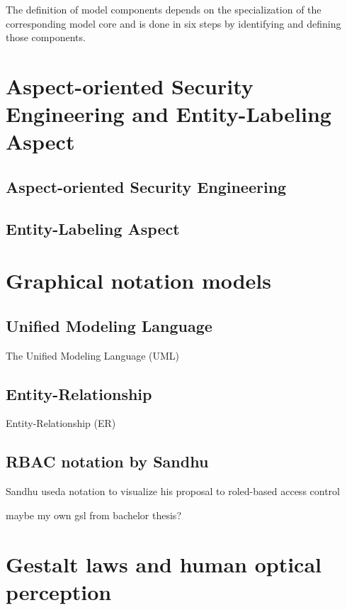 \documentclass[twoside, openright, 12pt]{book}
\begin{document}
The definition of model components depends on the specialization of the corresponding model core and is done in six steps by identifying and defining those components.



\section{Aspect-oriented Security Engineering and Entity-Labeling Aspect}
\label{AOSEEL}


\subsection{Aspect-oriented Security Engineering}
\label{AOSE}


\subsection{Entity-Labeling Aspect}
\label{EL}




\section{Graphical notation models}
\label{graphical_notations}

\subsection{Unified Modeling Language}
\label{UML}
The Unified Modeling Language (UML)

\subsection{Entity-Relationship}
\label{ER}
Entity-Relationship (ER)

\subsection{RBAC notation by Sandhu}
\label{RBAC_notation}
Sandhu useda notation to visualize his proposal to roled-based access control

maybe my own gsl from bachelor thesis?



\section{Gestalt laws and human optical perception}
\label{gestalt_laws_and_human_optical_perception}
\end{document}
